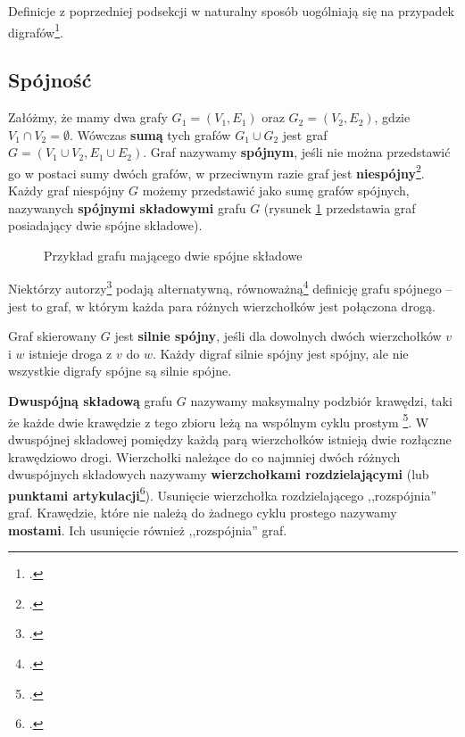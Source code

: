 Definicje z poprzedniej podsekcji w naturalny sposób uogólniają się na przypadek digrafów\footcite[136]{wilson}. 

\subsection*{Spójność}

Załóżmy, że mamy dwa grafy $G_1 = (V_1,E_1)$ oraz $G_2 = (V_2,E_2)$, gdzie $V_1 \cap V_2 = \emptyset$. Wówczas \textbf{sumą} tych grafów $G_1 \cup G_2$ jest graf $G=(V_1\cup V_2, E_1\cup E_2)$. Graf nazywamy \textbf{spójnym}, jeśli nie można przedstawić go w postaci sumy dwóch grafów, w przeciwnym razie graf jest \textbf{niespójny}\footcite[22]{wilson}. Każdy graf niespójny $G$ możemy przedstawić jako sumę grafów spójnych, nazywanych \textbf{spójnymi składowymi} grafu $G$ (rysunek \ref{fig:connected-copoments-example} przedstawia graf posiadający dwie spójne składowe). 

\begin{figure}[h]
\centering
{}
\caption{Przykład grafu mającego dwie spójne składowe} \label{fig:connected-copoments-example}
\end{figure}

Niektórzy autorzy\footcite[342]{ross} podają alternatywną, równoważną\footcite[42]{wilson} definicję grafu spójnego -- jest to graf, w którym każda para różnych wierzchołków jest połączona drogą. 

Graf skierowany $G$ jest \textbf{silnie spójny}, jeśli dla dowolnych dwóch wierzchołków $v$ i $w$ istnieje droga z $v$ do $w$. Każdy digraf silnie spójny jest spójny, ale nie wszystkie digrafy spójne są silnie spójne. 

\textbf{Dwuspójną składową} grafu $G$ nazywamy maksymalny podzbiór krawędzi, taki że każde dwie krawędzie z tego zbioru leżą na wspólnym cyklu prostym \footcite[634]{cormen}. W dwuspójnej składowej pomiędzy każdą parą wierzchołków istnieją dwie rozłączne krawędziowo drogi. Wierzchołki należące do co najmniej dwóch różnych dwuspójnych składowych nazywamy \textbf{wierzchołkami rozdzielającymi} (lub \textbf{punktami artykulacji}\footcite[633]{cormen}). Usunięcie wierzchołka rozdzielającego ,,rozspójnia'' graf. Krawędzie, które nie należą do żadnego cyklu prostego nazywamy \textbf{mostami}. Ich usunięcie również ,,rozspójnia'' graf.

